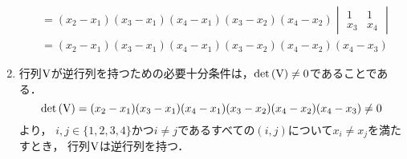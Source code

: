 \begin{enumerate}[label=(\roman*)]
\begin{align}
          &= (x_2 - x_1) (x_3 - x_1) (x_4 - x_1) (x_3 - x_2) (x_4 - x_2)
          \begin{vmatrix}
            1 & 1 \\
            x_3 & x_4
          \end{vmatrix}\\
          &= (x_2 - x_1) (x_3 - x_1) (x_4 - x_1) (x_3 - x_2) (x_4 - x_2) (x_4 - x_3)
      \end{align}
    \item 行列$\mathrm{V}$が逆行列を持つための必要十分条件は，$\det{(\mathrm{V})} \neq 0$であることである．
      \begin{equation}
        \det{(\mathrm{V})} = (x_2 - x_1) (x_3 - x_1) (x_4 - x_1) (x_3 - x_2) (x_4 - x_2) (x_4 - x_3) \neq 0
      \end{equation}
      より，
      $i, j \in \{1, 2, 3, 4\}$かつ$i \neq j$であるすべての$(i, j)$について$x_i \neq x_j$を満たすとき，
      行列$\mathrm{V}$は逆行列を持つ．
      
  \end{enumerate}